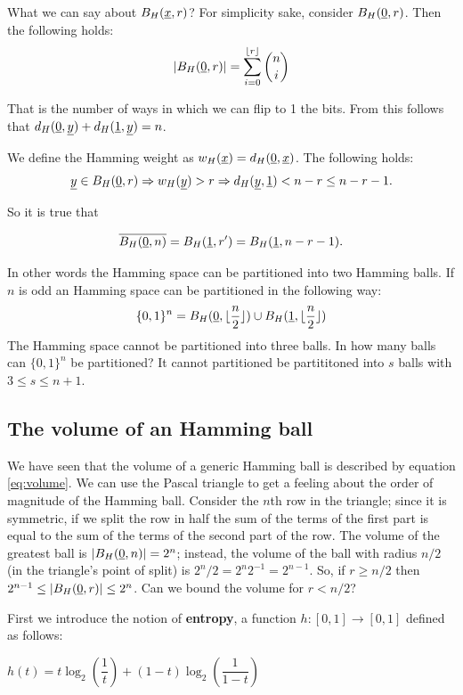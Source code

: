 What we can say about $B_H(\underline{x}, r)$? For simplicity sake, consider $B_H(\underline{0}, r)$. Then the following holds:
\begin{equation}\label{eq:volume}
	|B_H(\underline{0}, r)| = \sum_{i = 0}^{\lfloor r \rfloor} \binom{n}{i}
\end{equation}

That is the number of ways in which we can flip to 1 the bits. From this follows that $d_H(\underline{0}, \underline{y}) + d_H(\underline{1}, \underline{y}) = n$.

We define the Hamming weight as $w_H(\underline{x}) = d_H(\underline{0}, \underline{x})$. The following holds:
$$\underline{y} \in B_H(\underline{0}, r) \Rightarrow w_H(\underline{y}) > r \Rightarrow d_H(\underline{y}, \underline{1}) < n - r \leq n -r - 1.$$

So it is true that

$$\overline{B_H(\underline{0}, n)} = B_H(\underline{1}, r') = B_H(\underline{1}, n - r - 1).$$

In other words the Hamming space can be partitioned into two Hamming balls. If $n$ is odd an Hamming space can be partitioned in the following way: $$\{0, 1\}^n = B_H(\underline{0}, \lfloor \dfrac{n}{2}\rfloor ) \cup B_H(\underline{1}, \lfloor \dfrac{n}{2}\rfloor)$$
The Hamming space cannot be partitioned into three balls. In how many balls can $\{0, 1\}^n$ be partitioned? It cannot partitioned be partititoned into $s$ balls with $3 \leq s \leq n + 1$.

\subsection{The volume of an Hamming ball}
We have seen that the volume of a generic Hamming ball is described by equation \ref{eq:volume}. We can use the Pascal triangle to get a feeling about the order of magnitude of the Hamming ball. Consider the $n$th row in the triangle; since it is symmetric, if we split the row in half the sum of the terms of the first part is equal to the sum of the terms of the second part of the row. The volume of the greatest ball is $|B_H(\underline{0}, n)| = 2^n$; instead, the volume of the ball with radius $n/2$ (in the triangle's point of split) is $2^n/2 = 2^n2^{-1} = 2^{n-1}$. So, if $r \geq n/2$ then $2^{n-1} \leq |B_H(\underline{0}, r)| \leq 2^n$. Can we bound the volume for $r < n/2$?

First we introduce the notion of \textbf{entropy}, a function $h: [0, 1] \rightarrow [0, 1]$ defined as follows:
\begin{center}
	$h(t) = t\log_2(\dfrac{1}{t}) + (1 - t)\log_2\left(\dfrac{1}{1-t}\right)$
\end{center}

